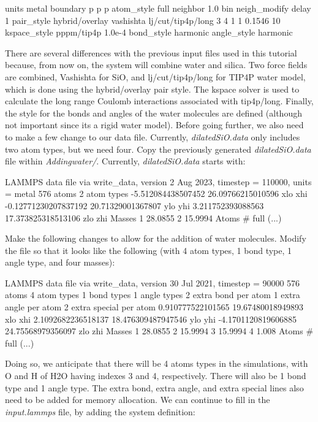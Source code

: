 \begin{lcverbatim}
units metal
boundary p p p
atom_style full
neighbor 1.0 bin
neigh_modify delay 1
pair_style hybrid/overlay vashishta lj/cut/tip4p/long 3 4 1 1 0.1546 10
kspace_style pppm/tip4p 1.0e-4
bond_style harmonic
angle_style harmonic
\end{lcverbatim}

\noindent There are several differences with the previous input files
used in this tutorial because, from now on, the system will combine water and silica.
Two force fields are combined, Vashishta for
SiO, and lj/cut/tip4p/long for TIP4P water model, which is
done using the hybrid/overlay pair style.
The kspace solver is used to calculate the long
range Coulomb interactions associated with tip4p/long.
Finally, the style for the bonds and angles
of the water molecules are defined (although not important
since its a rigid water model).
Before going further, we also need to make a few change to our data file.
Currently, \textit{dilatedSiO.data} only includes two atom types, but
we need four. Copy the previously generated \textit{dilatedSiO.data}
file within \textit{Addingwater/}. Currently, \textit{dilatedSiO.data} starts with:

\begin{lcverbatim}
LAMMPS data file via write_data, version 2 Aug 2023, timestep = 110000, units = metal
576 atoms
2 atom types
-5.512084438507452 26.09766215010596 xlo xhi
-0.12771230207837192 20.71329001367807 ylo yhi
3.211752393088563 17.373825318513106 zlo zhi
Masses
1 28.0855
2 15.9994
Atoms # full
(...)
\end{lcverbatim}

\noindent Make the following changes to allow for the addition of water
molecules. Modify the file so that it looks like the following 
(with 4 atom types, 1 bond type, 1 angle type, and four masses):

\begin{lcverbatim}
LAMMPS data file via write_data, version 30 Jul 2021, timestep = 90000
576 atoms
4 atom types
1 bond types
1 angle types
2 extra bond per atom
1 extra angle per atom
2 extra special per atom
0.910777522101565 19.67480018949893 xlo xhi
2.1092682236518137 18.476309487947546 ylo yhi
-4.1701120819606885 24.75568979356097 zlo zhi
Masses
1 28.0855
2 15.9994
3 15.9994
4 1.008
Atoms # full
(...)
\end{lcverbatim}

\noindent Doing so, we anticipate that there will be 4 atoms types in
the simulations, with O and H of H2O having indexes 3 and 4,
respectively. There will also be 1 bond type and 1 angle
type. The extra bond, extra angle, and extra special lines
also need to be added for memory allocation. 
We can continue to fill in the
\textit{input.lammps} file, by adding the system definition:

